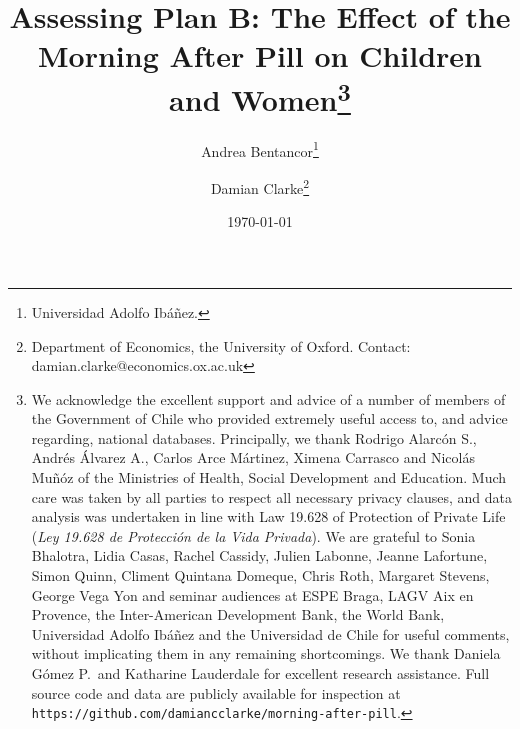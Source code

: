 \documentclass{article}[11pt,subeqn]
\title{Assessing Plan B: The Effect of the Morning After Pill on Children and 
Women\footnote{We acknowledge the excellent support and advice of a number of 
members of the Government of Chile who provided extremely useful access to, and 
advice regarding, national databases.  Principally, we thank Rodrigo Alarc\'on S., 
Andr\'es \'Alvarez A., Carlos Arce M\'artinez, Ximena Carrasco and Nicol\'as 
Mu\~n\'oz of the Ministries of Health, Social Development and Education.  Much 
care was taken by all parties to respect all necessary privacy clauses, and data 
analysis was undertaken in line with Law 19.628 of Protection of Private Life 
(\emph{Ley 19.628 de Protecci\'on de la Vida Privada}).  We are grateful to Sonia 
Bhalotra, Lidia Casas, Rachel Cassidy, Julien Labonne, Jeanne Lafortune, Simon 
Quinn, Climent Quintana Domeque, Chris Roth, Margaret Stevens, George
Vega Yon and seminar audiences at ESPE Braga, LAGV Aix en Provence,
the Inter-American Development Bank, the World Bank,
Universidad Adolfo Ib\'a\~nez and the Universidad de Chile for 
useful comments, without implicating them in any remaining shortcomings.  We 
thank Daniela G\'omez P.\ and Katharine Lauderdale for excellent research 
assistance.  Full source code and data are publicly available for inspection 
at \texttt{https://github.com/damiancclarke/morning-after-pill}.}}
\author{Andrea Bentancor\thanks{Universidad Adolfo Ib\'a\~nez.} 
\and Damian Clarke\thanks{Department of Economics, the University of Oxford.  
Contact: damian.clarke@economics.ox.ac.uk}}
\date{\today}
\begin{document}
\begin{spacing}{1.4}
\maketitle



\end{spacing}
\end{document}
